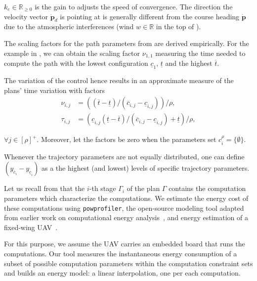 $k_e\in\mathbb{R}_{\geq 0}$ is the gain to adjusts the speed of convergence. The direction the velocity vector $\dot{\mathbf{p}}_d$ is pointing at is generally different from the course heading $\dot{\mathbf{p}}$ due to the atmospheric interferences (wind $w\in\mathbb{R}$ in the top of ).

The scaling factors for the path parameters from  are derived empirically. For the example in , we can obtain the scaling factor $\nu_{1,1}$ measuring the time needed to compute the path with the lowest configuration $\underline{c}_1$, $\underline{t}$ and the highest $\overline{t}$. 

The variation of the control hence results in an approximate measure of the plans' time variation with factors
\begin{subequations}\label{eq:scale-traj}\begin{align}
  \nu_{i,j}&=\left((\overline{t}-\underline{t})/(\overline{c}_{i,j}-\underline{c}_{i,j})\right)/\rho,\\
  \tau_{i,j}&=\left(\underline{c}_{i,j}(\underline{t}-\overline{t})/(\overline{c}_{i,j}-\underline{c}_{i,j})+\underline{t}\right)/\rho,
\end{align}\end{subequations} 

$\forall j\in[\rho]^+$. Moreover, let the factors be zero when the parameters set $c_i^\rho=\{\emptyset\}$.

Whenever the trajectory parameters are not equally distributed, one can define $(y_{\overline{c}_i}-y_{\underline{c}_i})$ as a the highest (and lowest) levels of specific trajectory parameters. 

Let us recall from  that the $i$-th stage $\Gamma_i$ of the plan $\Gamma$ contains the computation parameters which characterize the computations. We estimate the energy cost of these computations using {\small\tt{powprofiler}}, the open-source modeling tool adapted from earlier work on computational energy analysis~\citep{seewald2019coarse, seewald2019component}, and energy estimation of a fixed-wing UAV~\citep{seewald2020mechanical}. 

For this purpose, we assume the UAV carries an embedded board that runs the computations. Our tool measures the instantaneous energy consumption of a subset of possible computation parameters within the computation constraint sets and builds an energy model: a linear interpolation, one per each computation. 

